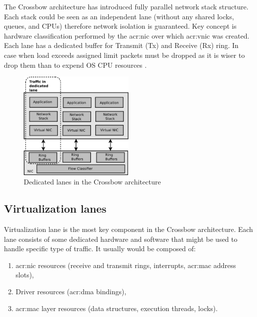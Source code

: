 \documentclass[11pt,openany]{book}
\begin{document}

        The Crossbow architecture has introduced fully parallel network stack structure. Each stack could be seen as an
        independent lane (without any shared locks, queues, and CPUs) therefore network isolation is guaranteed. Key
        concept is hardware classification performed by the \gls{acr:nic} over which \gls{acr:vnic} was created. Each
        lane has a dedicated buffer for Transmit (Tx) and Receive (Rx) ring. In case when load exceeds assigned limit
        packets must be dropped as it is wiser to drop them than to expend OS CPU resources \cite{crossbow}.

        \begin{figure}[H]
          \begin{center}
            \includegraphics[width=0.5\textwidth]{img/crossbow-traffic-dedicated-line.pdf}
          \end{center}

          \caption{Dedicated lanes in the Crossbow architecture}
        \end{figure}

		
      \subsection{Virtualization lanes}

        Virtualization lane is the most key component in the Crossbow architecture. Each lane consists of some dedicated
        hardware and software that might be used to handle specific type of traffic. It usually would be composed of: 

        \begin{enumerate}
          \item \gls{acr:nic} resources (receive and transmit rings, interrupts, \gls{acr:mac} address slots),
          \item Driver resources (\gls{acr:dma} bindings),
          \item \gls{acr:mac} layer resources (data structures, execution threads, locks).
        \end{enumerate}
        
\end{document}
